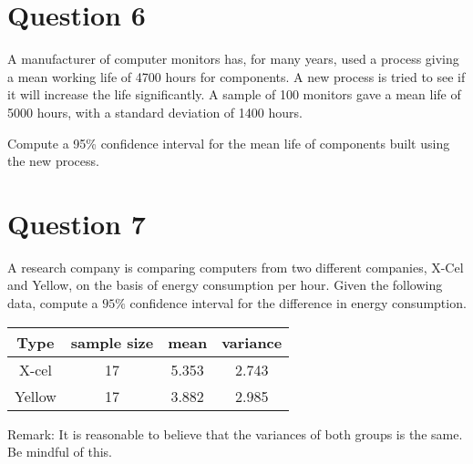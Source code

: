 \documentclass[]{article}
\begin{document}
\section*{Question 6}

A manufacturer of computer monitors has, for many years, used a process giving a mean working life of 4700 hours for components.
A new process is tried to see if it will increase the life significantly. A sample of 100 monitors gave a mean life of 5000 hours, with a standard deviation of 1400 hours.

Compute a 95\% confidence interval for the mean life of components built using the new process.


\section*{Question 7}
A research company is comparing computers from two different companies, X-Cel and Yellow, on the basis of energy consumption per hour. Given the following data, compute a $95\%$ confidence interval for the difference in energy consumption.
\begin{center}
	\begin{tabular}{|c|c|c|c|}
		\hline
		Type & sample size & mean & variance \\ \hline
		X-cel & 17 & 5.353 & 2.743 \\ \hline
		Yellow & 17 & 3.882 & 2.985 \\ \hline
	\end{tabular}
\end{center}
Remark: It is reasonable to believe that the variances of both groups is the same. Be mindful of this.
\end{document}
